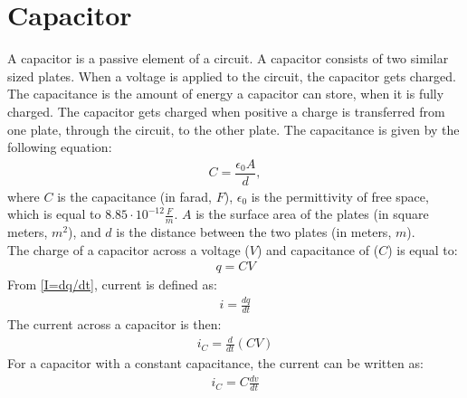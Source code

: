 \section{Capacitor}
A capacitor is a passive element of a circuit. A capacitor consists of two similar sized plates. When a voltage is applied to the circuit, the capacitor gets charged. The capacitance is the amount of energy a capacitor can store, when it is fully charged. The capacitor gets charged when positive a charge is transferred from one plate, through the circuit, to the other plate. The capacitance is given by the following equation:
\begin{align*}
C=\dfrac{\epsilon_{0}A}{d},
\end{align*}
where $C$ is the capacitance (in farad, $F$), $\epsilon_{0}$ is the permittivity of free space, which is equal to $8.85 \cdot 10^{-12}                                                 \frac{F}{m}$. $A$ is the surface area of the plates (in square meters, $m^{2}$), and $d$ is the distance between the two plates (in meters, $m$).
\\
The charge of a capacitor across a voltage ($V$) and capacitance of ($C$) is equal to:
\begin{align}
\label{QCV}
q = CV	
\end{align}
From \eqref{I=dq/dt}, current is defined as:
\begin{align*}
	i = \frac{dq}{dt}
\end{align*}
The current across a capacitor is then:
\begin{align*}
	i_C = \frac{d}{dt}(CV)
\end{align*}
For a capacitor with a constant capacitance, the current can be written as:
\begin{align}
	i_C = C\frac{dv}{dt}\label{iC}
\end{align}


